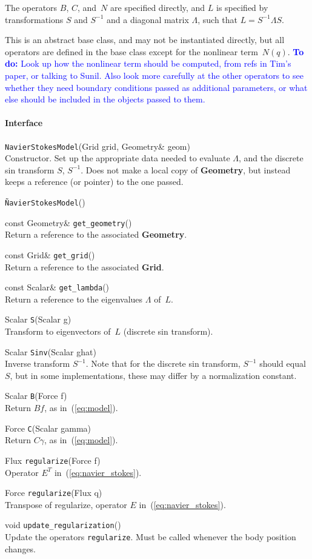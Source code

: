 \documentclass[11pt]{article}
\def\todo#1{\textcolor{blue}{{\bf To do:} #1}}
\def\class#1{{\bf #1}} %
\def\fn#1{{\tt #1}} %
\begin{document}
The operators $B$, $C$, and~$N$ are specified directly, and $L$ is specified by transformations $S$ and $S^{-1}$ and a diagonal matrix $\Lambda$, such that $L=S^{-1}\Lambda S$.

This is an abstract base class, and may not be instantiated directly, but all operators are defined in the base class except for the nonlinear term~$N(q)$.  \todo{Look up how the nonlinear term should be computed, from refs in Tim's paper, or talking to Sunil.  Also look more carefully at the other operators to see whether they need boundary conditions passed as additional parameters, or what else should be included in the objects passed to them.}

\paragraph{Interface}
\begin{description}
	\item \fn{NavierStokesModel}(Grid grid, Geometry\& geom)\\
		Constructor.  Set up the appropriate data needed to evaluate $\Lambda$, and the discrete sin transform $S$, $S^{-1}$.  Does not make a local copy of \class{Geometry}, but instead keeps a reference (or pointer) to the one passed.
	\item \fn{\~NavierStokesModel}()\\
	\item const Geometry\& \fn{get\_geometry}()\\
		Return a reference to the associated \class{Geometry}.
	\item const Grid\& \fn{get\_grid}()\\
		Return a reference to the associated \class{Grid}.
	\item const Scalar\& \fn{get\_lambda}()\\
		Return a reference to the eigenvalues $\Lambda$ of~$L$.
	\item Scalar \fn{S}(Scalar g)\\
		Transform to eigenvectors of~$L$ (discrete sin transform).
	\item Scalar \fn{Sinv}(Scalar ghat)\\
		Inverse transform $S^{-1}$.  Note that for the discrete sin transform, $S^{-1}$ should equal~$S$, but in some implementations, these may differ by a normalization constant.
	\item Scalar \fn{B}(Force f)\\
		Return $Bf$, as in~(\ref{eq:model}).
	\item Force \fn{C}(Scalar gamma)\\
		Return $C\gamma$, as in~(\ref{eq:model}).
	\item Flux \fn{regularize}(Force f) \\
		Operator $E^T$ in~(\ref{eq:navier_stokes}).
	\item Force \fn{regularize}(Flux q) \\
		Transpose of regularize, operator $E$ in~(\ref{eq:navier_stokes}).
	\item void \fn{update\_regularization}() \\
		Update the operators \fn{regularize}.  Must be called whenever the body position changes.
\end{description}
\end{document}
